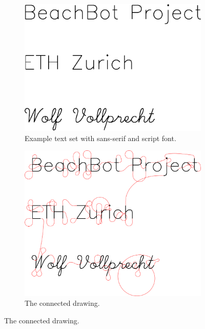 \begin{figure}[h]
\centering
\begin{subfigure}[t]{0.95\textwidth}
\centering
	\includegraphics[width=\textwidth]{images/results/hershey/hershey_text.pdf}
	\caption{Example text set with sans-serif and script font.}
\end{subfigure}
\par \bigskip
\begin{subfigure}[t]{0.95\textwidth}
\centering
	\includegraphics[width=\textwidth]{images/results/hershey/hershey_connected.pdf}
	\caption{The connected drawing.}
\end{subfigure}

\end{figure}

